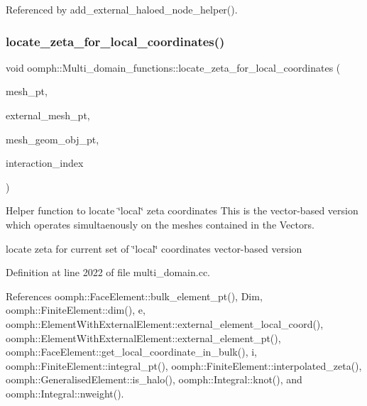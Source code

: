 Referenced by add\+\_\+external\+\_\+haloed\+\_\+node\+\_\+helper().

\mbox{\label{namespaceoomph_1_1Multi__domain__functions_a969b893c0f6f013c78076e4013c0f34c}} 
\subsubsection{\texorpdfstring{locate\+\_\+zeta\+\_\+for\+\_\+local\+\_\+coordinates()}{locate\_zeta\_for\_local\_coordinates()}}
{\footnotesize\ttfamily void oomph\+::\+Multi\+\_\+domain\+\_\+functions\+::locate\+\_\+zeta\+\_\+for\+\_\+local\+\_\+coordinates (\begin{DoxyParamCaption}\item[{const \hyperlink{classoomph_1_1Vector}{Vector}$<$ \hyperlink{classoomph_1_1Mesh}{Mesh} $\ast$$>$ \&}]{mesh\+\_\+pt,  }\item[{\hyperlink{classoomph_1_1Mesh}{Mesh} $\ast$const \&}]{external\+\_\+mesh\+\_\+pt,  }\item[{\hyperlink{classoomph_1_1Vector}{Vector}$<$ \hyperlink{classoomph_1_1MeshAsGeomObject}{Mesh\+As\+Geom\+Object} $\ast$$>$ \&}]{mesh\+\_\+geom\+\_\+obj\+\_\+pt,  }\item[{const unsigned \&}]{interaction\+\_\+index }\end{DoxyParamCaption})}



Helper function to locate \char`\"{}local\char`\"{} zeta coordinates This is the vector-\/based version which operates simultaenously on the meshes contained in the Vectors. 

locate zeta for current set of \char`\"{}local\char`\"{} coordinates vector-\/based version 

Definition at line 2022 of file multi\+\_\+domain.\+cc.



References oomph\+::\+Face\+Element\+::bulk\+\_\+element\+\_\+pt(), Dim, oomph\+::\+Finite\+Element\+::dim(), e, oomph\+::\+Element\+With\+External\+Element\+::external\+\_\+element\+\_\+local\+\_\+coord(), oomph\+::\+Element\+With\+External\+Element\+::external\+\_\+element\+\_\+pt(), oomph\+::\+Face\+Element\+::get\+\_\+local\+\_\+coordinate\+\_\+in\+\_\+bulk(), i, oomph\+::\+Finite\+Element\+::integral\+\_\+pt(), oomph\+::\+Finite\+Element\+::interpolated\+\_\+zeta(), oomph\+::\+Generalised\+Element\+::is\+\_\+halo(), oomph\+::\+Integral\+::knot(), and oomph\+::\+Integral\+::nweight().



